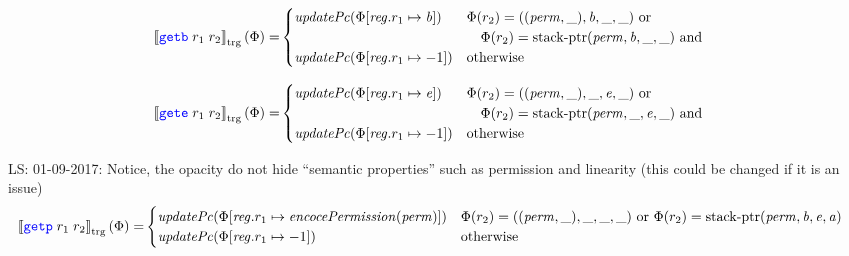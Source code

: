 \documentclass[a4paper]{article}
\newcommand\lau[1]{{\color{purple} \sf \footnotesize {LS: #1}}\\}
\newcommand{\sem}[1]{\left\llbracket #1 \right\rrbracket}
\newcommand{\tsem}[2][\Phi]{\sem{#2}_{\mathrm{trg}}(#1)}
\newcommand{\tand}{\text{ and }}
\newcommand{\totherwise}{\text{otherwise }}
\newcommand{\sourcecolor}[1]{\color{blue}}
\newcommand{\src}[1]{{\sourcecolor{} #1}}
\newcommand{\zinstr}[1]{\texttt{#1}}
\newcommand{\twoinstr}[3]{
  \ifthenelse{\equal{#2#3}{}}
  {\zinstr{#1}}
  {\zinstr{#1} \; #2 \; #3}
}
\newcommand{\sgetb}[2]{\twoinstr{\src{getb}}{#1}{#2}}
\newcommand{\sgete}[2]{\twoinstr{\src{gete}}{#1}{#2}}
\newcommand{\sgetp}[2]{\twoinstr{\src{getp}}{#1}{#2}}
\newcommand{\update}[2]{[#1 \mapsto #2]}
\newcommand{\updReg}[2]{\update{\reg.#1}{#2}}
\newcommand{\perm}{\var{perm}}
\newcommand{\stkptr}[1]{\mathrm{stack\text{-}ptr}(#1)}
\newcommand{\var}[1]{\mathit{#1}}
\newcommand{\reg}{\var{reg}}
\newcommand{\baddr}{\var{b}}
\newcommand{\eaddr}{\var{e}}
\newcommand{\aaddr}{\var{a}}
\newcommand{\plainfun}[2]{
  \ifthenelse{\equal{#2}{}}
  {\mathit{#1}}
  {\mathit{#1}(#2)}
}
\newcommand{\encPerm}[1]{\plainfun{encocePermission}{#1}}
\newcommand{\updPcAddr}[1]{\plainfun{updatePc}{#1}}
\begin{document}
\begin{align*}
  \tsem{\sgetb{r_1}{r_2}} = &
                              \begin{cases}
                                \updPcAddr{\Phi\update{\reg.r_1}{\baddr}} & 
                                \arraycolsep=0pt
                                \begin{array}[t]{l}
                                  \Phi(r_2) = ((\perm,\_),\baddr,\_,\_) \text{ or } \\
                                  \quad \Phi(r_2) = \stkptr{\perm,\baddr,\_,\_} \tand\\
                                \end{array} \\
                                \updPcAddr{\Phi\updReg{r_1}{-1}} & \totherwise
                              \end{cases}
\end{align*}

\begin{align*}
  \tsem{\sgete{r_1}{r_2}} = &
                              \begin{cases}
                                \updPcAddr{\Phi\update{\reg.r_1}{\eaddr}} & 
                                \arraycolsep=0pt
                                \begin{array}[t]{l}
                                  \Phi(r_2) = ((\perm,\_),\_,\eaddr,\_) \text{ or } \\
                                  \quad \Phi(r_2) = \stkptr{\perm,\_,\eaddr,\_} \tand\\
                                \end{array} \\
                                \updPcAddr{\Phi\updReg{r_1}{-1}} & \totherwise
                              \end{cases}
\end{align*}

\lau{01-09-2017: Notice, the opacity do not hide ``semantic properties'' such as permission and linearity (this could be changed if it is an issue)}

\begin{align*}
  \tsem{\sgetp{r_1}{r_2}} = & 
                              \begin{cases}
                                \updPcAddr{}(\Phi\update{\reg.r_1}{\encPerm{\perm}}) & \Phi(r_2) = ((\perm,\_),\_,\_,\_) \text{ or } \Phi(r_2) = \stkptr{\perm,\baddr,\eaddr,\aaddr}\\
                                \updPcAddr{\Phi\updReg{r_1}{-1}} & \totherwise
                              \end{cases}
\end{align*}
\end{document}
